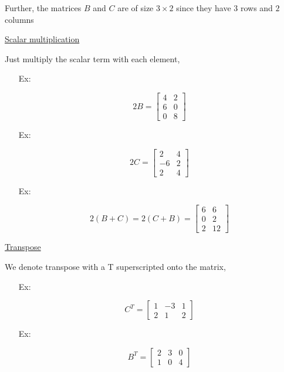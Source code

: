 \documentclass[reqno]{amsart}
\theoremstyle{definition}
\begin{document}
Further, the matrices $B$ and $C$ are of size $3 \times 2$ since they have $3$ rows and $2$ columns

\underline{Scalar multiplication}

Just multiply the scalar term with each element,
%
\begin{itemize}

\item[Ex:  ]

\begin{equation*}
2B = \begin{bmatrix}
4 & 2\\
6 & 0\\
0 & 8
\end{bmatrix}
\end{equation*}

\item[Ex:  ]

\begin{equation*}
2C = \begin{bmatrix}
2 & 4\\
-6 & 2\\
2 & 4
\end{bmatrix}
\end{equation*}

\item[Ex:  ]

\begin{equation*}
2(B+C) = 2(C+B) = \begin{bmatrix}
6 & 6\\
0 & 2\\
2 & 12
\end{bmatrix}
\end{equation*}

\end{itemize}

\bigskip

\underline{Transpose}

We denote transpose with a T superscripted onto the matrix,

\begin{itemize}

\item[Ex:  ]

\begin{equation*}
C^T = \begin{bmatrix}
1 & -3 & 1\\
2 & 1 & 2
\end{bmatrix}
\end{equation*}

\item[Ex:  ]

\begin{equation*}
B^T = \begin{bmatrix}
2 & 3 & 0\\
1 & 0 & 4
\end{bmatrix}
\end{equation*}

\end{itemize}
\end{document}
